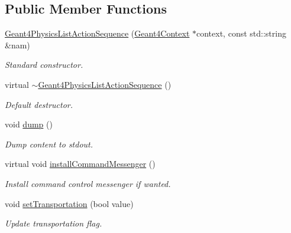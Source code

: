 \subsection*{Public Member Functions}
\begin{DoxyCompactItemize}
\item 
\hyperlink{class_d_d4hep_1_1_simulation_1_1_geant4_physics_list_action_sequence_a84052034e7ed2064137d76ee87af85d5}{Geant4PhysicsListActionSequence} (\hyperlink{class_d_d4hep_1_1_simulation_1_1_geant4_context}{Geant4Context} $\ast$context, const std::string \&nam)
\begin{DoxyCompactList}\small\item\em Standard constructor. \item\end{DoxyCompactList}\item 
virtual \hyperlink{class_d_d4hep_1_1_simulation_1_1_geant4_physics_list_action_sequence_a2b2989ac26194d0579cf02256fbe70f8}{$\sim$Geant4PhysicsListActionSequence} ()
\begin{DoxyCompactList}\small\item\em Default destructor. \item\end{DoxyCompactList}\item 
void \hyperlink{class_d_d4hep_1_1_simulation_1_1_geant4_physics_list_action_sequence_a15c69e0f4c07f3188c37c7732f6ff6c7}{dump} ()
\begin{DoxyCompactList}\small\item\em Dump content to stdout. \item\end{DoxyCompactList}\item 
virtual void \hyperlink{class_d_d4hep_1_1_simulation_1_1_geant4_physics_list_action_sequence_a9c60c66de8a46726b0b3d781042c22a6}{installCommandMessenger} ()
\begin{DoxyCompactList}\small\item\em Install command control messenger if wanted. \item\end{DoxyCompactList}\item 
void \hyperlink{class_d_d4hep_1_1_simulation_1_1_geant4_physics_list_action_sequence_a0572d68ab6ffc8a826a84a4ae56f4327}{setTransportation} (bool value)
\begin{DoxyCompactList}\small\item\em Update transportation flag. \item\end{DoxyCompactList}\item 

\end{DoxyCompactItemize}
